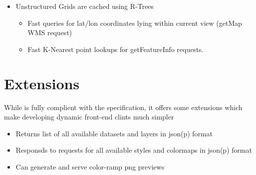 \documentclass[noback,noborder,portrait,twocolumn]{cuposter}
\begin{document}
\figspace{}

\begin{itemize}
    \item Unstructured Grids are cached using R-Trees
      \begin{itemize}
        \item Fast queries for lat/lon coordinates lying within current view (getMap WMS request)
        \item Fast K-Nearest point lookups for getFeatureInfo requests.
      \end{itemize}
\end{itemize}

\section{\wms{} Extensions}

While \sciwms{} is fully complient with the \ogc{} \wms{}
specification, it offers some extensions which make developing
dynamic front-end clints much simpler

\begin{itemize}
  \item Returns list of all available datasets and layers in json(p) format
  \item Responsds to requests for all available styles and colormaps in json(p) format
  \item Can generate and serve color-ramp png previews
\end{itemize}
\end{document}
